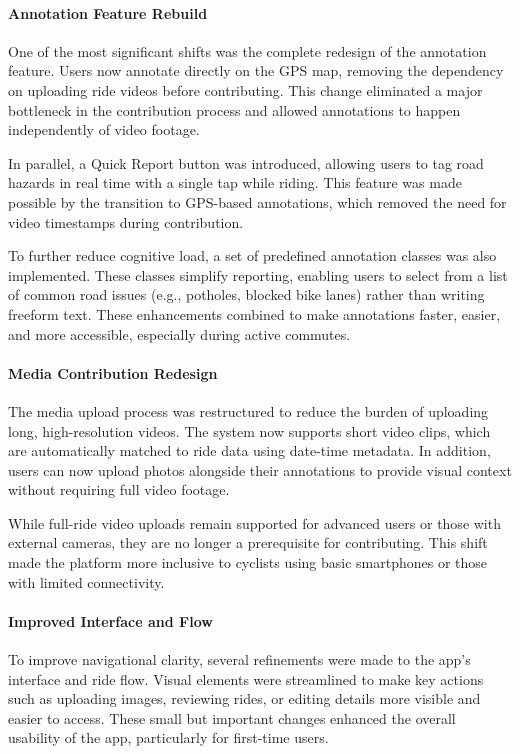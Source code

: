 \paragraph{Annotation Feature Rebuild}
 
 One of the most significant shifts was the complete redesign of the annotation feature. Users now annotate directly on the GPS map, removing the dependency on uploading ride videos before contributing. This change eliminated a major bottleneck in the contribution process and allowed annotations to happen independently of video footage.

 In parallel, a Quick Report button was introduced, allowing users to tag road hazards in real time with a single tap while riding. This feature was made possible by the transition to GPS-based annotations, which removed the need for video timestamps during contribution.
 
To further reduce cognitive load, a set of predefined annotation classes was also implemented. These classes simplify reporting, enabling users to select from a list of common road issues (e.g., potholes, blocked bike lanes) rather than writing freeform text. These enhancements combined to make annotations faster, easier, and more accessible, especially during active commutes.

\paragraph{Media Contribution Redesign}

The media upload process was restructured to reduce the burden of uploading long, high-resolution videos. The system now supports short video clips, which are automatically matched to ride data using date-time metadata. In addition, users can now upload photos alongside their annotations to provide visual context without requiring full video footage.

While full-ride video uploads remain supported for advanced users or those with external cameras, they are no longer a prerequisite for contributing. This shift made the platform more inclusive to cyclists using basic smartphones or those with limited connectivity.

\paragraph{Improved Interface and Flow}

To improve navigational clarity, several refinements were made to the app's interface and ride flow. Visual elements were streamlined to make key actions such as uploading images, reviewing rides, or editing details more visible and easier to access. These small but important changes enhanced the overall usability of the app, particularly for first-time users.

